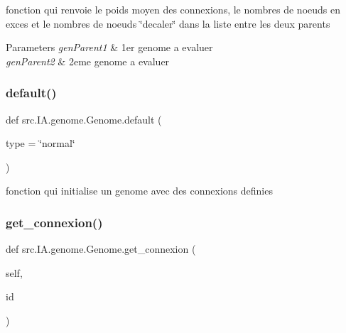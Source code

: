 fonction qui renvoie le poids moyen des connexions, le nombres de noeuds en exces et le nombres de noeuds \char`\"{}decaler\char`\"{} dans la liste entre les deux parents 


\begin{DoxyParams}{Parameters}
{\em gen\+Parent1} & 1er genome a evaluer \\
\hline
{\em gen\+Parent2} & 2eme genome a evaluer \\
\hline
\end{DoxyParams}
\mbox{\label{classsrc_1_1_i_a_1_1genome_1_1_genome_abaffc777e83e14be746e97f0b7b30738}} 
\subsubsection{\texorpdfstring{default()}{default()}}
{\footnotesize\ttfamily def src.\+I\+A.\+genome.\+Genome.\+default (\begin{DoxyParamCaption}\item[{}]{type = {\ttfamily \char`\"{}normal\char`\"{}} }\end{DoxyParamCaption})\hspace{0.3cm}{\ttfamily [static]}}



fonction qui initialise un genome avec des connexions definies 

\mbox{\label{classsrc_1_1_i_a_1_1genome_1_1_genome_a07ebf660dfb9962a4ceeb078537c5fb1}} 
\subsubsection{\texorpdfstring{get\+\_\+connexion()}{get\_connexion()}}
{\footnotesize\ttfamily def src.\+I\+A.\+genome.\+Genome.\+get\+\_\+connexion (\begin{DoxyParamCaption}\item[{}]{self,  }\item[{}]{id }\end{DoxyParamCaption})}



